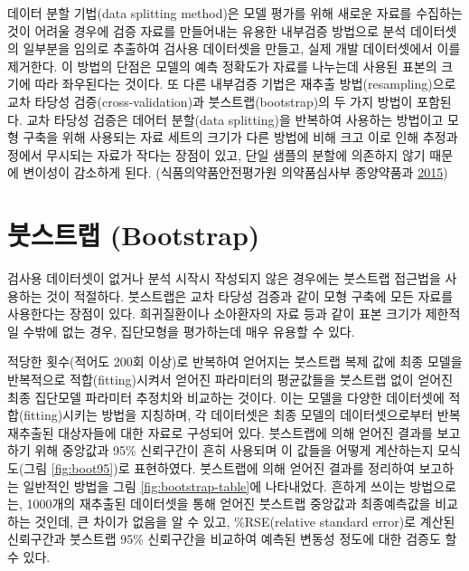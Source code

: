 \documentclass[
  11pt,
  krantz2,
  a4paper]{krantz}
\theoremstyle{definition}
\theoremstyle{definition}
\theoremstyle{definition}
\theoremstyle{remark}
\begin{document}
데이터 분할 기법(data splitting method)은 모델 평가를 위해 새로운 자료를 수집하는 것이 어려울 경우에 검증 자료를 만들어내는 유용한 내부검증 방법으로 분석 데이터셋의 일부분을 임의로 추출하여 검사용 데이터셋을 만들고, 실제 개발 데이터셋에서 이를 제거한다. 이 방법의 단점은 모델의 예측 정확도가 자료를 나누는데 사용된 표본의 크기에 따라 좌우된다는 것이다. 또 다른 내부검증 기법은 재추출 방법(resampling)으로 교차 타당성 검증(cross-validation)과 붓스트랩(bootstrap)의 두 가지 방법이 포함된다. 교차 타당성 검증은 데어터 분할(data splitting)을 반복하여 사용하는 방법이고 모형 구축을 위해 사용되는 자료 세트의 크기가 다른 방법에 비해 크고 이로 인해 추정과정에서 무시되는 자료가 작다는 장점이 있고, 단일 샘플의 분할에 의존하지 않기 때문에 변이성이 감소하게 된다. (식품의약품안전평가원 의약품심사부 종양약품과 \protect\hyperlink{ref-poppk}{2015})

\hypertarget{uxbd93uxc2a4uxd2b8uxb7a9-bootstrap}{%
\section{붓스트랩 (Bootstrap)}\label{uxbd93uxc2a4uxd2b8uxb7a9-bootstrap}}


검사용 데이터셋이 없거나 분석 시작시 작성되지 않은 경우에는 붓스트랩 접근법을 사용하는 것이 적절하다. 붓스트랩은 교차 타당성 검증과 같이 모형 구축에 모든 자료를 사용한다는 장점이 있다. 희귀질환이나 소아환자의 자료 등과 같이 표본 크기가 제한적일 수밖에 없는 경우, 집단모형을 평가하는데 매우 유용할 수 있다.

적당한 횟수(적어도 200회 이상)로 반복하여 얻어지는 붓스트랩 복제 값에 최종 모델을 반복적으로 적합(fitting)시켜서 얻어진 파라미터의 평균값들을 붓스트랩 없이 얻어진 최종 집단모델 파라미터 추정치와 비교하는 것이다. 이는 모델을 다양한 데이터셋에 적합(fitting)시키는 방법을 지칭하며, 각 데이터셋은 최종 모델의 데이터셋으로부터 반복 재추출된 대상자들에 대한 자료로 구성되어 있다. 붓스트랩에 의해 얻어진 결과를 보고하기 위해 중앙값과 95\% 신뢰구간이 흔히 사용되며 이 값들을 어떻게 계산하는지 모식도(그림 \ref{fig:boot95})로 표현하였다. 붓스트랩에 의해 얻어진 결과를 정리하여 보고하는 일반적인 방법을 그림 \ref{fig:bootstrap-table}에 나타내었다. 흔하게 쓰이는 방법으로는, 1000개의 재추출된 데이터셋을 통해 얻어진 붓스트랩 중앙값과 최종예측값을 비교하는 것인데, 큰 차이가 없음을 알 수 있고, \%RSE(relative standard error)로 계산된 신뢰구간과 붓스트랩 95\% 신뢰구간을 비교하여 예측된 변동성 정도에 대한 검증도 할 수 있다.
\end{document}
